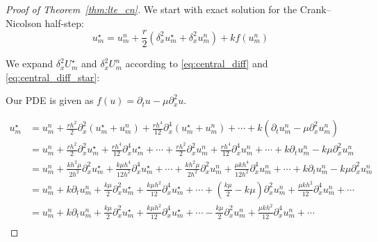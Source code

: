 \begin{proof}[Proof of Theorem~\ref{thm:lte_cn}]
  We start with exact solution for the Crank--Nicolson half-step:
  \[
    u_m^\star = u_m^n
    + \frac{r}{2}\left(\delta_x^2 u_m^\star + \delta_x^2 u_m^n\right)
    + k f(u_m^n)
  \]

  We expand \(\delta_x^2 U_m^\star\) and \(\delta_x^2 U_m^n\) according to \eqref{eq:central_diff} and \eqref{eq:central_diff_star}:

  Our PDE is given as \(f(u) = \partial_t u - \mu \partial_x^2 u \).

  \begin{align*}
    u_m^\star & = u_m^n
    + \tfrac{r h^2}{2}\partial_x^2 \left(u_m^\star + u_m^n\right)
    + \tfrac{rh^4}{12}\partial_x^4 \left(u_m^\star + u_m^n\right)
    + \cdots + k\left(\partial_t u_m^n - \mu \partial_x^2 u_m^n\right)                                                                                                                                                                                  \\
              & = u_m^n
    + \tfrac{r h^2}{2}\partial_x^2 u_m^\star + \tfrac{rh^4}{12}\partial_x^4 u_m^\star + \cdots
    + \tfrac{r h^2}{2}\partial_x^2 u_m^n + \tfrac{rh^4}{12}\partial_x^4 u_m^n + \cdots
    + k\partial_t u_m^n - k\mu \partial_x^2 u_m^n                                                                                                                                                                                                       \\
              & = u_m^n
    + \tfrac{k h^2 \mu}{2h^2}\partial_x^2 u_m^\star + \tfrac{k \mu h^4}{12h^2}\partial_x^4 u_m^\star + \cdots
    + \tfrac{k h^2 \mu }{2h^2}\partial_x^2 u_m^n + \tfrac{\mu k h^4}{12h^2}\partial_x^4 u_m^n + \cdots
    + k\partial_t u_m^n - k\mu \partial_x^2 u_m^n                                                                                                                                                                                                       \\
              & = u_m^n + k\partial_t u_m^n + \tfrac{k \mu}{2}\partial_x^2 u_m^\star + \tfrac{k \mu h^2}{12}\partial_x^4 u_m^\star + \cdots + \left(\tfrac{k\mu}{2} - k \mu\right)\partial_x^2 u_m^n + \tfrac{\mu k h^2}{12}\partial_x^4 u_m^n + \cdots \\
              & = u_m^n + k\partial_t u_m^n + \tfrac{k \mu}{2}\partial_x^2 u_m^\star + \tfrac{k \mu h^2}{12}\partial_x^4 u_m^\star + \cdots - \tfrac{k\mu}{2}\partial_x^2 u_m^n + \tfrac{\mu k h^2}{12}\partial_x^4 u_m^n + \cdots                      \\
  \end{align*}


\end{proof}
